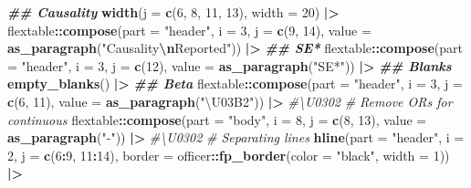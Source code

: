 \documentclass[
]{article}
\newenvironment{Shaded}{\begin{snugshade}}{\end{snugshade}}
\newcommand{\AttributeTok}[1]{\textcolor[rgb]{0.13,0.29,0.53}{#1}}
\newcommand{\CommentTok}[1]{\textcolor[rgb]{0.56,0.35,0.01}{\textit{#1}}}
\newcommand{\DecValTok}[1]{\textcolor[rgb]{0.00,0.00,0.81}{#1}}
\newcommand{\DocumentationTok}[1]{\textcolor[rgb]{0.56,0.35,0.01}{\textbf{\textit{#1}}}}
\newcommand{\FunctionTok}[1]{\textcolor[rgb]{0.13,0.29,0.53}{\textbf{#1}}}
\newcommand{\NormalTok}[1]{#1}
\newcommand{\SpecialCharTok}[1]{\textcolor[rgb]{0.81,0.36,0.00}{\textbf{#1}}}
\newcommand{\StringTok}[1]{\textcolor[rgb]{0.31,0.60,0.02}{#1}}
\begin{document}
\begin{landscape}
\begin{Shaded}
\begin{Highlighting}[]
  \DocumentationTok{\#\# Causality}
  \FunctionTok{width}\NormalTok{(}\AttributeTok{j =} \FunctionTok{c}\NormalTok{(}\DecValTok{6}\NormalTok{, }\DecValTok{8}\NormalTok{, }\DecValTok{11}\NormalTok{, }\DecValTok{13}\NormalTok{), }\AttributeTok{width =} \DecValTok{20}\NormalTok{) }\SpecialCharTok{|\textgreater{}}
\NormalTok{  flextable}\SpecialCharTok{::}\FunctionTok{compose}\NormalTok{(}\AttributeTok{part =} \StringTok{"header"}\NormalTok{, }\AttributeTok{i =} \DecValTok{3}\NormalTok{, }\AttributeTok{j =} \FunctionTok{c}\NormalTok{(}\DecValTok{9}\NormalTok{, }\DecValTok{14}\NormalTok{), }\AttributeTok{value =} \FunctionTok{as\_paragraph}\NormalTok{(}\StringTok{"Causality}\SpecialCharTok{\textbackslash{}n}\StringTok{Reported"}\NormalTok{)) }\SpecialCharTok{|\textgreater{}}
  \DocumentationTok{\#\# SE*}
\NormalTok{  flextable}\SpecialCharTok{::}\FunctionTok{compose}\NormalTok{(}\AttributeTok{part =} \StringTok{"header"}\NormalTok{, }\AttributeTok{i =} \DecValTok{3}\NormalTok{, }\AttributeTok{j =} \FunctionTok{c}\NormalTok{(}\DecValTok{12}\NormalTok{), }\AttributeTok{value =} \FunctionTok{as\_paragraph}\NormalTok{(}\StringTok{"SE*"}\NormalTok{)) }\SpecialCharTok{|\textgreater{}}
  \DocumentationTok{\#\# Blanks}
  \FunctionTok{empty\_blanks}\NormalTok{() }\SpecialCharTok{|\textgreater{}}
  \DocumentationTok{\#\# Beta}
\NormalTok{  flextable}\SpecialCharTok{::}\FunctionTok{compose}\NormalTok{(}\AttributeTok{part =} \StringTok{"header"}\NormalTok{, }\AttributeTok{i =} \DecValTok{3}\NormalTok{, }\AttributeTok{j =} \FunctionTok{c}\NormalTok{(}\DecValTok{6}\NormalTok{, }\DecValTok{11}\NormalTok{), }\AttributeTok{value =} \FunctionTok{as\_paragraph}\NormalTok{(}\StringTok{"\textbackslash{}U03B2"}\NormalTok{)) }\SpecialCharTok{|\textgreater{}} \CommentTok{\#\textbackslash{}U0302}
  \CommentTok{\# Remove ORs for continuous }
\NormalTok{  flextable}\SpecialCharTok{::}\FunctionTok{compose}\NormalTok{(}\AttributeTok{part =} \StringTok{"body"}\NormalTok{, }\AttributeTok{i =} \DecValTok{8}\NormalTok{, }\AttributeTok{j =} \FunctionTok{c}\NormalTok{(}\DecValTok{8}\NormalTok{, }\DecValTok{13}\NormalTok{), }\AttributeTok{value =} \FunctionTok{as\_paragraph}\NormalTok{(}\StringTok{"{-}"}\NormalTok{)) }\SpecialCharTok{|\textgreater{}} \CommentTok{\#\textbackslash{}U0302}
  \CommentTok{\# Separating lines}
  \FunctionTok{hline}\NormalTok{(}\AttributeTok{part =} \StringTok{"header"}\NormalTok{, }\AttributeTok{i =} \DecValTok{2}\NormalTok{, }\AttributeTok{j =} \FunctionTok{c}\NormalTok{(}\DecValTok{6}\SpecialCharTok{:}\DecValTok{9}\NormalTok{, }\DecValTok{11}\SpecialCharTok{:}\DecValTok{14}\NormalTok{), }\AttributeTok{border =}\NormalTok{ officer}\SpecialCharTok{::}\FunctionTok{fp\_border}\NormalTok{(}\AttributeTok{color =} \StringTok{"black"}\NormalTok{, }\AttributeTok{width =} \DecValTok{1}\NormalTok{)) }\SpecialCharTok{|\textgreater{}}

\end{Highlighting}
\end{Shaded}
\end{landscape}
\end{document}
